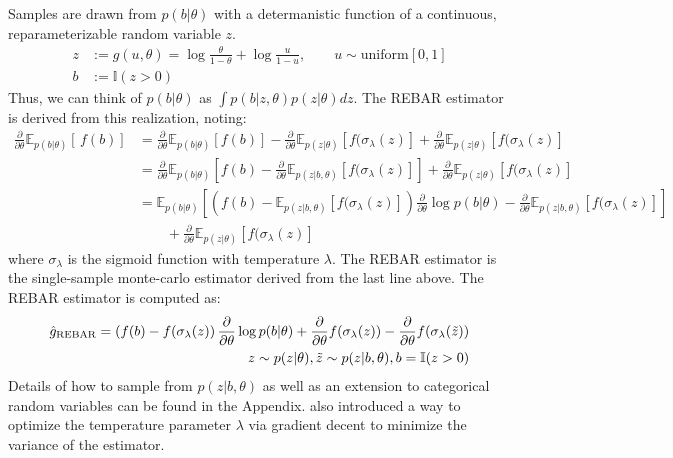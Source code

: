 \documentclass{article}
\newcommand{\discreteDist}{p(b|\theta)}
\newcommand{\loss}{f(b)}
\newcommand{\expectedLoss}{\mathbb{E}_{\discreteDist{}} \! \left[ \, \loss{} \right]}
\newcommand{\E}{\mathbb{E}}
\newcommand{\PT}{\frac{\partial}{\partial \theta}}
\begin{document}
Samples are drawn from $p(b|\theta)$ with a determanistic function of a continuous, reparameterizable random variable $z$. 
\begin{align}
z &:= g(u, \theta) = \log\frac{\theta}{1-\theta} + \log\frac{u}{1-u}, \qquad u \sim \text{uniform}[0,1]\nonumber\\
b &:= \mathbb{I}(z>0)\nonumber
\end{align}
Thus, we can think of $p(b|\theta)$ as $\int p(b|z, \theta)p(z|\theta)dz$. The REBAR estimator is derived from this realization, noting:
\begin{align}
\PT \expectedLoss{} &= \PT \E_{p(b|\theta)}\left[ f(b) \right] - \PT\E_{p(z|\theta)}\left[ f(\sigma_\lambda(z) \right] + \PT\E_{p(z|\theta)}\left[ f(\sigma_\lambda(z) \right]\nonumber\\
&= \PT \E_{p(b|\theta)}\left[ f(b) - \PT\E_{p(z|b, \theta)}\left[ f(\sigma_\lambda(z) \right]  \right] + \PT\E_{p(z|\theta)}\left[ f(\sigma_\lambda(z) \right]\nonumber\\
&= \E_{p(b|\theta)}\left[\left( f(b) - \E_{p(z|b, \theta)}\left[ f(\sigma_\lambda(z) \right] \right)\PT \log p(b|\theta)  - \PT \E_{p(z|b, \theta)}\left[ f(\sigma_\lambda(z) \right] \right]\nonumber\\
&\qquad + \PT\E_{p(z|\theta)}\left[ f(\sigma_\lambda(z) \right]\nonumber
\end{align}
where $\sigma_\lambda$ is the sigmoid function with temperature $\lambda$. The REBAR estimator is the single-sample monte-carlo estimator derived from the last line above. The REBAR estimator is computed as:
\begin{align}
\hat g_\textnormal{REBAR} = \left(f(b) - f(\sigma_\lambda(z)\right)\PT \log p(b|\theta) + \PT f(\sigma_\lambda(z)) - \PT f(\sigma_\lambda(\tilde{z}))\nonumber\\
z \sim p(z|\theta), \tilde{z} \sim p(z|b, \theta), b = \mathbb{I}(z>0)\nonumber
\end{align}
Details of how to sample from $p(z|b, \theta)$ as well as an extension to categorical random variables can be found in the Appendix. \cite{tucker2017rebar} also introduced a way to optimize the temperature parameter $\lambda$ via gradient decent to minimize the variance of the estimator. 
\end{document}
